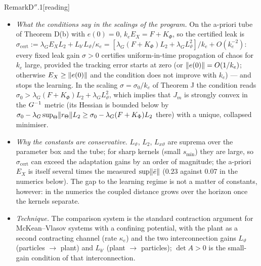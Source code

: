 \begin{rmk}{Remark}{D$''$.1}[reading]
\begin{itemize}
    separating force of the residual), is where Theorems H, I and K live, where the averaged interaction is
    non-reciprocal, and where uniformity in time remains the open part of Section~\ref{sec:program}, branch 3.
  \item \emph{What the conditions say in the scalings of the program.} On the a-priori tube of Theorem D(b) with
    $e(0) = 0$, $k_eE_X = F + K_\Phi$, so the certified leak is
    $\sigma_{\mathrm{cert}} := \lambda_GE_XL_2 + L_{b'}L_\vartheta/\kappa_e
    = [\lambda_G(F + K_\Phi)L_2 + \lambda_GL_\vartheta^2]/k_e + O(k_e^{-2})$: every fixed leak gain $\sigma > 0$
    certifies uniform-in-time propagation of chaos for $k_e$ large, provided the tracking error starts at zero (or
    $\lVert e(0)\rVert = O(1/k_e)$; otherwise $E_X \ge \lVert e(0)\rVert$ and the condition does not improve with $k_e$) --- and
    stops the learning. In the scaling $\sigma = \sigma_0/k_e$ of Theorem J the condition reads
    $\sigma_0 > \lambda_G(F + K_\Phi)L_2 + \lambda_GL_\vartheta^2$, which implies that $J_m$ is strongly convex in the
    $G^{-1}$ metric (its Hessian is bounded below by
    $\sigma_0 - \lambda_G\sup_\Theta\lVert r_\Theta\rVert L_2 \ge \sigma_0 - \lambda_G(F + K_\Phi)L_2$ there) with a unique,
    collapsed minimiser.
  \item \emph{Why the constants are conservative.} $L_\vartheta$, $L_2$, $L_{x\vartheta}$ are suprema over the
    parameter box and the tube; for sharp kernels (small $s_{\min}$) they are large, so $\sigma_{\mathrm{cert}}$ can
    exceed the adaptation gains by an order of magnitude; the a-priori $E_X$ is itself several times the measured
    $\sup\lVert \bar e\rVert$ ($0.23$ against $0.07$ in the numerics below). The gap to the learning regime is not a matter
    of constants, however: in the numerics the coupled distance grows over the horizon once the kernels separate.
  \item \emph{Technique.} The comparison system is the standard contraction argument for McKean--Vlasov systems with
    a confining potential, with the plant as a second contracting channel (rate $\kappa_e$) and the two
    interconnection gains $L_\vartheta$ (particles $\to$ plant) and $L_{b'}$ (plant $\to$ particles); $\det A > 0$ is
    the small-gain condition of that interconnection.
\end{itemize}
\end{rmk}

